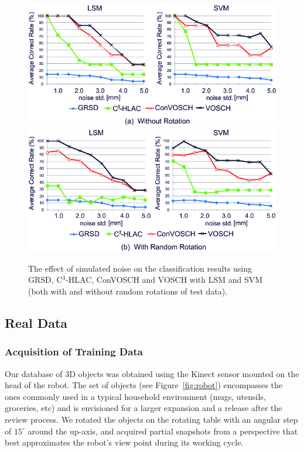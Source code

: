 \documentclass[letterpaper, 10 pt, conference]{sty/ieeeconf}
\begin{document}
\begin{figure}[tb!]
  \centering
  \includegraphics[width=.49\textwidth]{figures/synthetic_experiment/synthetic_experimental_result_1.png}
  \includegraphics[width=.49\textwidth]{figures/synthetic_experiment/synthetic_experimental_result_2.png}
  \caption{The effect of simulated noise on the classification results using GRSD, C$^3$-HLAC, ConVOSCH and VOSCH with LSM and SVM
    (both with and without random rotations of test data).}
  \label{fig:synthetic}
\end{figure}


\subsection{Real Data}
\label{sec:real_data}
\subsubsection{Acquisition of Training Data}
Our database of 3D objects was obtained using the Kinect sensor mounted on the head of the robot.
The set of objects (see Figure~\ref{fig:robot}) encompasses the ones commonly used
in a typical household environment (mugs, utensils, groceries, etc) and is envisioned for a
larger expansion and a release after the review process. We rotated the objects on the rotating table with
an angular step of $15^\circ$ around the up-axis, and acquired partial
snapshots from a perspective that best approximates the robot's view point during its working cycle.  

\end{document}
